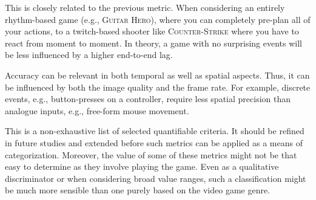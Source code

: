  This is closely related to the previous metric. When considering an entirely rhythm-based game (e.g., \textsc{Guitar Hero}), where you can completely pre-plan all of your actions, to a twitch-based shooter like \textsc{Counter-Strike} where you have to react from moment to moment. In theory, a game with no surprising events will be less influenced by a higher end-to-end lag.

 Accuracy can be relevant in both temporal as well as spatial aspects. Thus, it can be influenced by both the image quality and the frame rate. For example, discrete events, e.g., button-presses on a controller, require less spatial precision than analogue inputs, e.g., free-form mouse movement.

This is a non-exhaustive list of selected quantifiable criteria. It should be refined in future studies and extended before such metrics can be applied as a means of categorization. Moreover, the value of some of these metrics might not be that easy to determine as they involve playing the game. Even as a qualitative discriminator or when considering broad value ranges, such a classification might be much more sensible than one purely based on the video game genre.